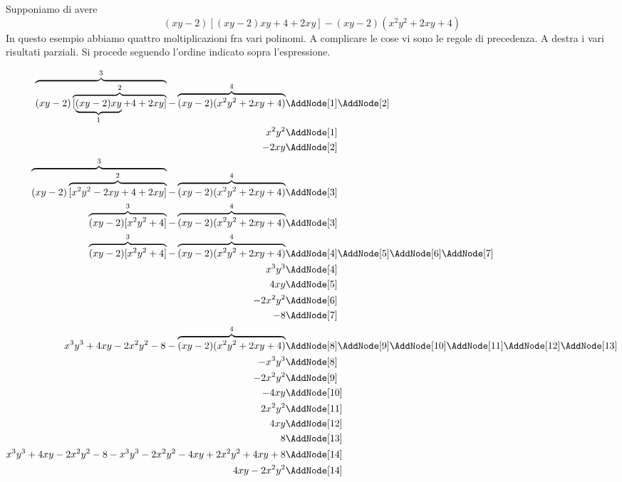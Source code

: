 \begin{esempiot}{}{}
Supponiamo di avere \[(xy-2)[(xy-2)xy+4+2xy]-(xy-2)(x^2y^2+2xy+4)\]
In questo esempio abbiamo quattro moltiplicazioni  fra vari polinomi. A complicare le cose vi sono le regole di precedenza. A destra i vari risultati parziali. Si procede seguendo l'ordine indicato sopra l'espressione. 
	\begin{NodesList}
		\begin{align*}
			\overbrace{(xy-2)\overbrace{[\underbrace{(xy-2)xy}_{1}+4+2xy]}^{2}}^{3}-\overbrace{(xy-2)(x^2y^2+2xy+4)}^{4} &\AddNode[1]\AddNode[2]\\
			x^2y^2&\AddNode[1]\\ 
			-2xy&\AddNode[2] \\
			\overbrace{(xy-2)\overbrace{[x^2y^2-2xy+4+2xy]}^{2}}^{3}-\overbrace{(xy-2)(x^2y^2+2xy+4)}^{4} &\AddNode[3]\\
			\overbrace{(xy-2)[x^2y^2+4]}^{3}-\overbrace{(xy-2)(x^2y^2+2xy+4)}^{4} &\AddNode[3]\\
			\overbrace{(xy-2)[x^2y^2+4]}^{3}-\overbrace{(xy-2)(x^2y^2+2xy+4)}^{4} &\AddNode[4]\AddNode[5]\AddNode[6]\AddNode[7]\\
			x^3y^3&\AddNode[4]\\    
			4xy&\AddNode[5]\\
			-2x^2y^2&\AddNode[6]\\
			-8&\AddNode[7]\\
			x^3y^3+4xy-2x^2y^2-8-\overbrace{(xy-2)(x^2y^2+2xy+4)}^{4} &\AddNode[8]\AddNode[9]\AddNode[10]\AddNode[11]\AddNode[12]\AddNode[13]\\
			-x^3y^3&\AddNode[8]\\
			-2x^2y^2&\AddNode[9]\\
			-4xy&\AddNode[10]\\   
			2x^2y^2&\AddNode[11] \\ 
			4xy&\AddNode[12]\\     
			8&\AddNode[13]\\   
			x^3y^3+4xy-2x^2y^2-8-x^3y^3-2x^2y^2-4xy+2x^2y^2+4xy+8 &\AddNode[14]\\
			4xy-2x^2y^2 &\AddNode[14]
		\end{align*}
	\end{NodesList}
\end{esempiot}
